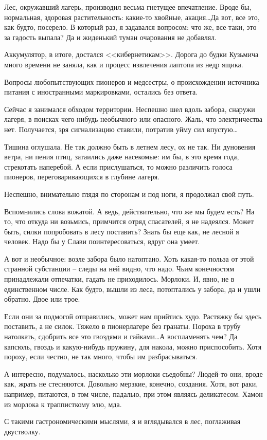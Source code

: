 \documentclass[a4paper]{book}
\begin{document}
Лес, окружавший лагерь, производил весьма гнетущее впечатление. Вроде бы, нормальная, здоровая растительность: какие-то хвойные, акация\ldots Да вот, все это, как будто, посерело. В который раз, я задавался вопросом: что же, все-таки, это за гадость выпала?  Да и жиденький туман очарования не добавлял. 

Аккумулятор, в итоге, достался <<кибернетикам>>. Дорога до будки Кузьмича  много времени не заняла, как и процесс извлечения лаптопа из недр ящика. 

Вопросы любопытствующих пионеров и медсестры, о происхождении источника питания с иностранными маркировками, остались без ответа. 

Сейчас я занимался обходом территории. Неспешно шел вдоль забора, снаружи лагеря, в поисках чего-нибудь необычного или опасного. Жаль, что электричества нет. Получается, зря сигнализацию ставили, потратив уйму сил впустую\ldots

Тишина оглушала. Не так должно быть в летнем лесу, ох не так. Ни дуновения ветра, ни пения птиц, затаились даже насекомые: им бы, в это время года, стрекотать наперебой. А если прислушаться, то можно различить голоса пионеров, переговаривающихся в глубине лагеря.

Неспешно, внимательно глядя по сторонам и под ноги, я продолжал свой путь. 

Вспомнились слова вожатой. А ведь, действительно, что же мы будем есть? На то, что откуда ни возьмись, примчится отряд спасателей, я не надеялся. Может быть, силки попробовать в лесу поставить? Знать бы еще как, не лесной я человек. Надо бы у Слави поинтересоваться, вдруг она умеет.

А вот и необычное: возле забора было натоптано. Хоть какая-то польза от этой странной субстанции -- следы на ней видно, что надо. Чьим конечностям принадлежали отпечатки, гадать не приходилось. Морлоки. И, явно, не в единственном числе. Как будто, вышли из леса, потоптались у забора, да и ушли обратно. Двое или трое. 

Если они за подмогой отправились, может нам прийтись худо. Растяжку бы здесь поставить, а не силок. Тяжело в пионерлагере без гранаты. Пороха в трубу натолкать, сдобрить все это гвоздями и гайками\ldots А воспламенять чем? Да капсюль, гвоздь и какую-нибудь пружину, для накола, можно приспособить. Хотя пороху, если честно, не так много, чтобы им разбрасываться. 

А интересно, подумалось, насколько эти морлоки съедобны? Людей-то они, вроде как, жрать не стесняются. Довольно мерзкие, конечно, создания. Хотя, вот раки, например, питаются, в том числе, падалью, при этом являясь деликатесом. Хамон из морлока к трапписткому элю, мда.

С такими гастрономическими мыслями, я и вглядывался в лес, поглаживая двустволку. 
\end{document}
